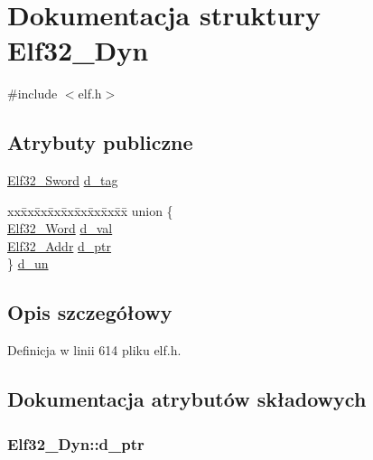 \hypertarget{struct_elf32___dyn}{\section{Dokumentacja struktury Elf32\-\_\-\-Dyn}
\label{struct_elf32___dyn}
}


{\ttfamily \#include $<$elf.\-h$>$}

\subsection*{Atrybuty publiczne}
\begin{DoxyCompactItemize}
\item 
\hyperlink{elf_8h_a30ce6352cf03c667272698ada477da95}{Elf32\-\_\-\-Sword} \hyperlink{struct_elf32___dyn_a0edbe45a1c49cbb352dc3e1937369180}{d\-\_\-tag}
\item 
\begin{tabbing}
xx\=xx\=xx\=xx\=xx\=xx\=xx\=xx\=xx\=\kill
union \{\\
\>\hyperlink{elf_8h_af5924ece606c732e86f8263a19408e45}{Elf32\_Word} \hyperlink{struct_elf32___dyn_a00a89085454a384ae77fd9112b3062c7}{d\_val}\\
\>\hyperlink{elf_8h_a40c6d4571e6001f443cc6a6474620158}{Elf32\_Addr} \hyperlink{struct_elf32___dyn_adcdb4fa1682c07a7e7874c99f9cbd028}{d\_ptr}\\
\} \hyperlink{struct_elf32___dyn_ae099cc9b66d91c8d96a079c748491c99}{d\_un}\\

\end{tabbing}\end{DoxyCompactItemize}


\subsection{Opis szczegółowy}


Definicja w linii 614 pliku elf.\-h.



\subsection{Dokumentacja atrybutów składowych}
\hypertarget{struct_elf32___dyn_adcdb4fa1682c07a7e7874c99f9cbd028}{
\subsubsection[{d\-\_\-ptr}]{ Elf32\-\_\-\-Dyn\-::d\-\_\-ptr}}\label{struct_elf32___dyn_adcdb4fa1682c07a7e7874c99f9cbd028}


